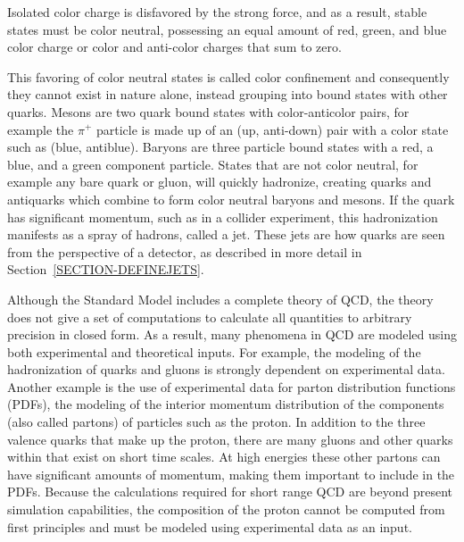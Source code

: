 
Isolated color charge is disfavored by the strong force, and as a result, stable states must be color neutral, possessing an equal amount of red, green, and blue color charge or color and anti-color charges that sum to zero. 

This favoring of color neutral states is called color confinement and consequently they cannot exist in nature alone, instead grouping into bound states with other quarks. Mesons are two quark bound states with color-anticolor pairs, for example the $\pi^+$ particle is made up of an (up, anti-down) pair with a color state such as (blue, antiblue). Baryons are three particle bound states with a red, a blue, and a green component particle. States that are not color neutral, for example any bare quark or gluon, will quickly hadronize, creating quarks and antiquarks which combine to form color neutral baryons and mesons. If the quark has significant momentum, such as in a collider experiment, this hadronization manifests as a spray of hadrons, called a jet. These jets are how quarks are seen from the perspective of a detector, as described in more detail in Section~\ref{SECTION-DEFINEJETS}. 

Although the Standard Model includes a complete theory of QCD, the theory does not give a set of computations to calculate all quantities to arbitrary precision in closed form. As a result, many phenomena in QCD are modeled using both experimental and theoretical inputs. For example, the modeling of the hadronization of quarks and gluons is strongly dependent on experimental data. Another example is the use of experimental data for parton distribution functions (PDFs), the modeling of the interior momentum distribution of the components (also called partons) of particles such as the proton. In addition to the three valence quarks that make up the proton, there are many gluons and other quarks within that exist on short time scales. At high energies these other partons can have significant amounts of momentum, making them important to include in the PDFs. Because the calculations required for short range QCD are beyond present simulation capabilities, the composition of the proton cannot be computed from first principles and must be modeled using experimental data as an input. 


